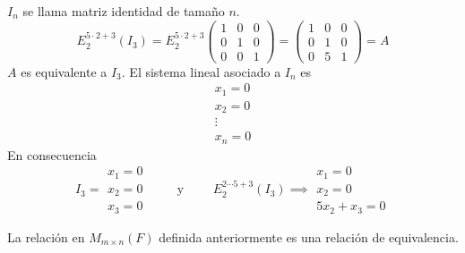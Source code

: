 \documentclass[12pt,a4paper]{book}
\begin{document}
    \begin{ejemplo}
    \label{ej:7}
        $I_{n}$ se llama matriz identidad de tamaño $n$.
        \begin{equation*}
            E_{2}^{5\cdot2+3}(I_{3})=E_{2}^{5\cdot2+3}
            \begin{pmatrix}
                1 & 0 & 0\\
                0 & 1 & 0\\
                0 & 0 & 1
            \end{pmatrix}
            =
            \begin{pmatrix}
                1 & 0 & 0\\
                0 & 1 & 0\\
                0 & 5 & 1
            \end{pmatrix}
            =A
        \end{equation*}
        $A$ es equivalente a $I_{3}$. El sistema lineal asociado a $I_{n}$ es
        \begin{equation*}
            \begin{matrix}
                x_{1}=0\\
                x_{2}=0\\
                \vdots\\
                x_{n}=0
            \end{matrix}
        \end{equation*}
        En consecuencia
        \begin{equation*}
            I_{3}=
            \begin{matrix}
                x_{1}=0\\
                x_{2}=0\\
                x_{3}=0
            \end{matrix}
            \qquad
            \text{ y }
            \qquad
            E_{2}^{2\cdots5+3}(I_{3})\implies
            \begin{matrix}
                x_{1}=0\\
                x_{2}=0\\
                5x_{2}+x_{3}=0
            \end{matrix}
        \end{equation*}
    \end{ejemplo}
    

    \begin{proposicion}
    \label{prop:2}
        La relación en $M_{m\times n}(F)$ definida anteriormente es una relación de equivalencia.
    \end{proposicion}
\end{document}
